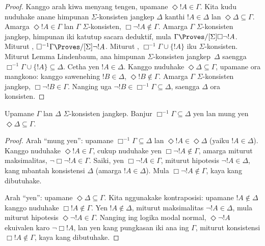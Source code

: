 \documentclass[../../../include/open-logic-section]{subfiles}
\begin{document}
{\begin{proof}
Kanggo arah kiwa menyang tengen, upamane $\Diamond !A \in \Gamma$.
  Kita kudu nuduhake anane himpunan $\Sigma$-konsisten jangkep $\Delta$
  kanthi $!A \in \Delta$ lan $\Diamond\Delta \subseteq \Gamma$. Amarga
  $\Diamond !A \in \Gamma$ lan $\Gamma$ $\Sigma$-konsisten,
  $\Box\lnot !A \notin \Gamma$. Amarga $\Gamma$ $\Sigma$-konsisten
  jangkep, himpunan iki katutup sacara deduktif, mula $\Gamma
  \Proves/[\Sigma] \Box\lnot !A$. Miturut ,
  $\Box^{-1}\Gamma \Proves/[\Sigma] \lnot !A$. Miturut
  ,
  $\Box^{-1}\Gamma \cup \{ !A \}$ iku $\Sigma$-konsisten. Miturut
  Lemma Lindenbaum, ana himpunan $\Sigma$-konsisten jangkep~$\Delta$
  saengga $\Box^{-1}\Gamma \cup \{ !A \} \subseteq
  \Delta$. Cetha yen $!A \in \Delta$. Kanggo nuduhake $\Diamond\Delta
  \subseteq \Gamma$, upamane ora mangkono: kanggo sawenehing $!B \in \Delta$,
  $\Diamond !B \notin \Gamma$. Amarga $\Gamma$ $\Sigma$-konsisten
  jangkep, $\Box\lnot !B \in \Gamma$. Nanging uga $\lnot
  !B \in \Box^{-1}\Gamma \subseteq \Delta$, saengga $\Delta$
  ora konsisten.
\end{proof}
}

\begin{lem}
  Upamane $\Gamma$ lan $\Delta$ $\Sigma$-konsisten jangkep.
  Banjur $\Box^{-1}\Gamma \subseteq \Delta$ yen lan mung yen
  $\Diamond\Delta \subseteq \Gamma$.
\end{lem}

\begin{proof}
  Arah ``mung yen'': upamane $\Box^{-1}\Gamma \subseteq \Delta$ lan
  $\Diamond!A \in \Diamond\Delta$ (yaiku $!A \in \Delta$). Kanggo
  nuduhake $\Diamond!A \in \Gamma$, cukup nuduhake yen
  $\Box\lnot!A \notin \Gamma$, amarga miturut maksimalitas,
  $\lnot\Box\lnot !A \in \Gamma$. Saiki, yen $\Box\lnot!A \in \Gamma$,
  miturut hipotesis $\lnot!A \in \Delta$, kang mbantah konsistensi
  $\Delta$ (amarga $!A \in \Delta$). Mula $\Box\lnot!A \notin \Gamma$,
  kaya kang dibutuhake.

Arah ``yen'': upamane $\Diamond\Delta
  \subseteq \Gamma$. Kita nggunakake kontraposisi: upamane $!A
  \notin \Delta$ kanggo nuduhake $\Box!A \notin \Gamma$. Yen
  $!A \notin \Delta$, miturut maksimalitas $\lnot!A \in \Delta$,
  mula miturut hipotesis $\Diamond\lnot!A \in \Gamma$. Nanging ing
  logika modal normal, $\Diamond\lnot!A$ ekuivalen karo
  $\lnot\Box !A$, lan yen kang pungkasan iki ana ing $\Gamma$, miturut
  konsistensi $\Box!A \notin\Gamma$, kaya kang dibutuhake.
\end{proof}
\end{document}
